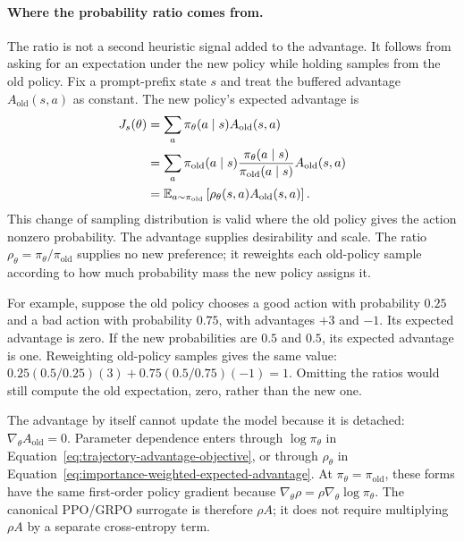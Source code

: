 \paragraph{Where the probability ratio comes from.}
The ratio is not a second heuristic signal added to the advantage. It follows from asking
for an expectation under the new policy while holding samples from the old policy. Fix a
prompt-prefix state $s$ and treat the buffered advantage
$A_{\mathrm{old}}(s,a)$ as constant. The new policy's expected advantage is
\begin{align}
  J_s(\theta)
    &= \sum_a \pi_\theta(a\mid s)A_{\mathrm{old}}(s,a) \notag\\
    &= \sum_a \pi_{\mathrm{old}}(a\mid s)
       \frac{\pi_\theta(a\mid s)}{\pi_{\mathrm{old}}(a\mid s)}
       A_{\mathrm{old}}(s,a) \notag\\
    &= \mathbb{E}_{a\sim\pi_{\mathrm{old}}}
       \left[\rho_\theta(s,a)A_{\mathrm{old}}(s,a)\right].
  \label{eq:importance-weighted-expected-advantage}
\end{align}
This change of sampling distribution is valid where the old policy gives the action
nonzero probability. The advantage supplies desirability and scale. The ratio
$\rho_\theta=\pi_\theta/\pi_{\mathrm{old}}$ supplies no new preference; it reweights each
old-policy sample according to how much probability mass the new policy assigns it.

For example, suppose the old policy chooses a good action with probability $0.25$ and a
bad action with probability $0.75$, with advantages $+3$ and $-1$. Its expected advantage
is zero. If the new probabilities are $0.5$ and $0.5$, its expected advantage is one.
Reweighting old-policy samples gives the same value:
$0.25(0.5/0.25)(3)+0.75(0.5/0.75)(-1)=1$. Omitting the ratios would still compute the old
expectation, zero, rather than the new one.

The advantage by itself cannot update the model because it is detached:
$\nabla_\theta A_{\mathrm{old}}=0$. Parameter dependence enters through
$\log\pi_\theta$ in Equation~\ref{eq:trajectory-advantage-objective}, or through
$\rho_\theta$ in Equation~\ref{eq:importance-weighted-expected-advantage}. At
$\pi_\theta=\pi_{\mathrm{old}}$, these forms have the same first-order policy gradient
because $\nabla_\theta\rho=\rho\nabla_\theta\log\pi_\theta$. The canonical PPO/GRPO
surrogate is therefore $\rho A$; it does not require multiplying $\rho A$ by a separate
cross-entropy term.

